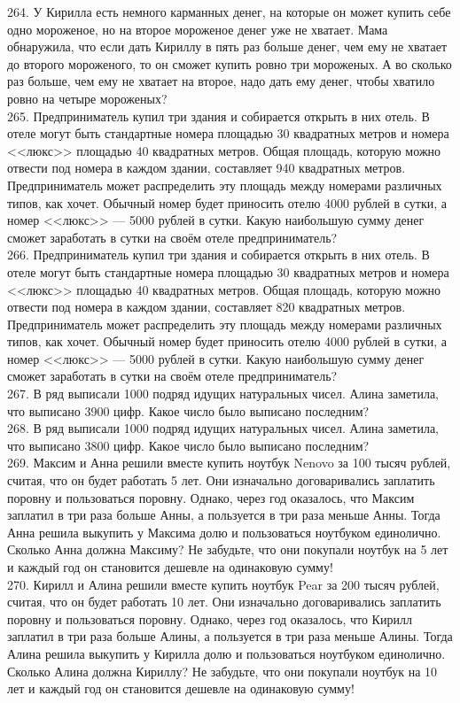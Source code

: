 264. У Кирилла есть немного карманных денег, на которые он может купить себе одно мороженое, но на второе мороженое денег уже не хватает. Мама обнаружила, что если дать Кириллу в пять раз больше денег, чем ему не хватает до второго мороженого, то он сможет купить ровно три мороженых. А во сколько раз больше, чем ему не хватает на второе, надо дать ему денег, чтобы хватило ровно на четыре мороженых?\\
265. Предприниматель купил три здания и собирается открыть в них отель. В отеле могут быть стандартные номера площадью 30 квадратных метров и номера <<люкс>> площадью 40 квадратных метров. Общая площадь, которую можно отвести под номера в каждом здании, составляет 940 квадратных метров. Предприниматель может распределить эту площадь между номерами различных типов, как хочет. Обычный номер будет приносить отелю 4000 рублей в сутки, а номер <<люкс>> --- 5000 рублей в сутки. Какую наибольшую сумму денег сможет заработать в сутки на своём отеле предприниматель?\\
266. Предприниматель купил три здания и собирается открыть в них отель. В отеле могут быть стандартные номера площадью 30 квадратных метров и номера <<люкс>> площадью 40 квадратных метров. Общая площадь, которую можно отвести под номера в каждом здании, составляет 820 квадратных метров. Предприниматель может распределить эту площадь между номерами различных типов, как хочет. Обычный номер будет приносить отелю 4000 рублей в сутки, а номер <<люкс>> --- 5000 рублей в сутки. Какую наибольшую сумму денег сможет заработать в сутки на своём отеле предприниматель?\\
267. В ряд выписали 1000 подряд идущих натуральных чисел. Алина заметила, что выписано 3900 цифр. Какое число было выписано последним?\\
268. В ряд выписали 1000 подряд идущих натуральных чисел. Алина заметила, что выписано 3800 цифр. Какое число было выписано последним?\\
269. Максим и Анна решили вместе купить ноутбук Nenovo за 100 тысяч рублей, считая, что он будет работать 5 лет. Они изначально договаривались заплатить поровну и пользоваться поровну. Однако, через год оказалось, что Максим заплатил в три раза больше Анны, а пользуется в три раза меньше Анны. Тогда Анна решила выкупить у Максима долю и пользоваться ноутбуком единолично. Сколько Анна должна Максиму? Не забудьте, что они покупали ноутбук на 5 лет и каждый год он становится дешевле на одинаковую сумму!\\
270. Кирилл и Алина решили вместе купить ноутбук Pear за 200 тысяч рублей, считая, что он будет работать 10 лет. Они изначально договаривались заплатить поровну и пользоваться поровну. Однако, через год оказалось, что Кирилл заплатил в три раза больше Алины, а пользуется в три раза меньше Алины. Тогда Алина решила выкупить у Кирилла долю и пользоваться ноутбуком единолично. Сколько Алина должна Кириллу? Не забудьте, что они покупали ноутбук на 10 лет и каждый год он становится дешевле на одинаковую сумму!\\
